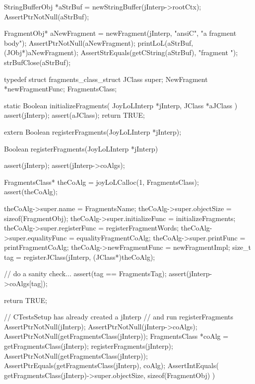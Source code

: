   StringBufferObj *aStrBuf = newStringBuffer(jInterp->rootCtx);
  AssertPtrNotNull(aStrBuf);
  
  FragmentObj* aNewFragment =
    newFragment(jInterp, "ansiC", "a fragment body");
  AssertPtrNotNull(aNewFragment);
  printLoL(aStrBuf, (JObj*)aNewFragment);
  AssertStrEquals(getCString(aStrBuf), "fragment ");
  strBufClose(aStrBuf);
\stopCTest
\stopTestCase
\stopTestSuite

\startTestSuite[registerFragments]

\startCHeader
typedef struct fragments_class_struct {
  JClass       super;
  NewFragment      *newFragmentFunc;
} FragmentsClass;

\stopCHeader

\startCCode
static Boolean initializeFragments(
  JoyLoLInterp *jInterp,
  JClass   *aJClass
) {
  assert(jInterp);
  assert(aJClass);
  return TRUE;
}
\stopCCode

\startCHeader
extern Boolean registerFragments(JoyLoLInterp *jInterp);
\stopCHeader
{}

\startCCode
Boolean registerFragments(JoyLoLInterp *jInterp) {
  assert(jInterp);
  assert(jInterp->coAlgs);
  
  FragmentsClass* theCoAlg
    = joyLoLCalloc(1, FragmentsClass);
  assert(theCoAlg);
  
  theCoAlg->super.name           = FragmentsName;
  theCoAlg->super.objectSize     = sizeof(FragmentObj);
  theCoAlg->super.initializeFunc = initializeFragments;
  theCoAlg->super.registerFunc   = registerFragmentWords;
  theCoAlg->super.equalityFunc   = equalityFragmentCoAlg;
  theCoAlg->super.printFunc      = printFragmentCoAlg;
  theCoAlg->newFragmentFunc = newFragmentImpl;
  size_t tag =
    registerJClass(jInterp, (JClass*)theCoAlg);
  
  // do a sanity check...
  assert(tag == FragmentsTag);
  assert(jInterp->coAlgs[tag]);
   
  return TRUE;
}
\stopCCode


\startCTest
  // CTestsSetup has already created a jInterp
  // and run registerFragments
  AssertPtrNotNull(jInterp);
  AssertPtrNotNull(jInterp->coAlgs);
  AssertPtrNotNull(getFragmentsClass(jInterp));
  FragmentsClass *coAlg = getFragmentsClass(jInterp);
  registerFragments(jInterp);
  AssertPtrNotNull(getFragmentsClass(jInterp));
  AssertPtrEquals(getFragmentsClass(jInterp), coAlg);
  AssertIntEquals(
    getFragmentsClass(jInterp)->super.objectSize,
    sizeof(FragmentObj)
  )
\stopCTest
\stopTestCase
\stopTestSuite
